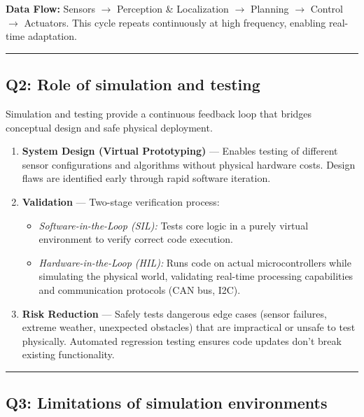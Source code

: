 \documentclass[12pt,a4paper]{article}
\begin{document}
\noindent\textbf{Data Flow:} Sensors $\rightarrow$ Perception \& Localization $\rightarrow$ Planning $\rightarrow$ Control $\rightarrow$ Actuators. This cycle repeats continuously at high frequency, enabling real-time adaptation.

\vspace{0.3em}
\noindent\rule{\textwidth}{0.4pt}
\vspace{0.3em}

\subsection{Q2: Role of simulation and testing}

Simulation and testing provide a continuous feedback loop that bridges conceptual design and safe physical deployment.


\begin{enumerate}[leftmargin=*]
    \item \textbf{System Design (Virtual Prototyping)} — Enables testing of different sensor configurations and algorithms without physical hardware costs. Design flaws are identified early through rapid software iteration.
    
    \item \textbf{Validation} — Two-stage verification process:
    \begin{itemize}
        \item \textit{Software-in-the-Loop (SIL):} Tests core logic in a purely virtual environment to verify correct code execution.
        \item \textit{Hardware-in-the-Loop (HIL):} Runs code on actual microcontrollers while simulating the physical world, validating real-time processing capabilities and communication protocols (CAN bus, I2C).
    \end{itemize}
    
    \item \textbf{Risk Reduction} — Safely tests dangerous edge cases (sensor failures, extreme weather, unexpected obstacles) that are impractical or unsafe to test physically. Automated regression testing ensures code updates don't break existing functionality.
\end{enumerate}

\vspace{0.3em}
\noindent\rule{\textwidth}{0.4pt}
\vspace{0.3em}

\subsection{Q3: Limitations of simulation environments}
\end{document}
